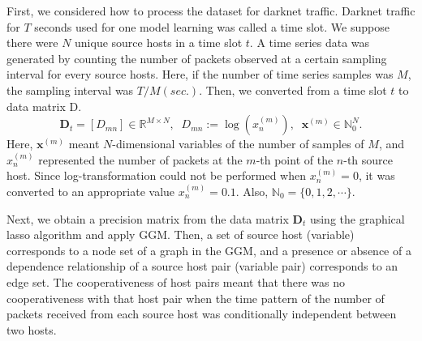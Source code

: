 \documentclass[conference]{IEEEtran}
\begin{document}
First, we considered how to process the dataset for darknet traffic.
Darknet traffic for $T$ seconds used for one model learning was called a time slot.
We suppose there were $N$ unique source hosts in a time slot $t$.
A time series data was generated by counting the number of packets observed at a certain sampling interval for every source hosts.
Here, if the number of time series samples was $M$, the sampling interval was $T/M (sec.)$.
Then, we converted from a time slot $t$ to data matrix D.
\begin{equation*}
\bm{D}_t=[D_{mn}]\in\mathbb{R}^{M \times N},
\;\;D_{mn} := \log(x_n^{(m)}),
\;\;\bm{x}^{(m)}\in\mathbb{N}_0^{N}.
\end{equation*}
Here, $\bm{x}^{(m)}$ meant $N$-dimensional variables of the number of samples of $M$, and $x_n^{(m)}$ represented the number of packets at the $m$-th point of the $n$-th source host.
Since log-transformation could not be performed when $x_n^{(m)}=0$, it was converted to an appropriate value $x_n^{(m)}=0.1$.
Also, $\mathbb{N}_0=\{0,1,2,\cdots\}$.

Next, we obtain a precision matrix from the data matrix $\bm{D}_t$ using the graphical lasso algorithm and apply GGM.
Then, a set of source host (variable) corresponds to a node set of a graph in the GGM, and a presence or absence of a dependence relationship of a source host pair (variable pair) corresponds to an edge set.
The cooperativeness of host pairs meant that there was no cooperativeness with that host pair when the time pattern of the number of packets received from each source host was conditionally independent between two hosts.
\end{document}
